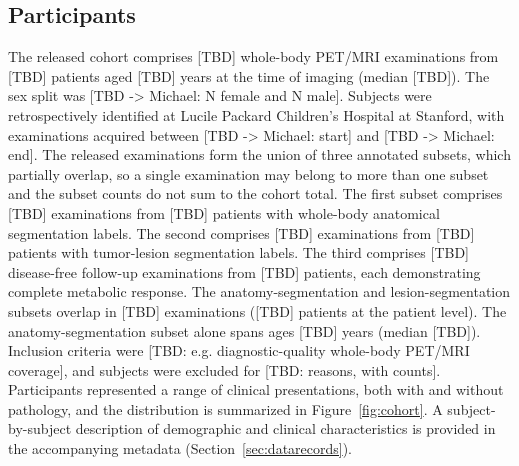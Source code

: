\subsection*{Participants}\label{subsec:cohort}
The released cohort comprises [TBD] whole-body PET/MRI examinations from [TBD] patients aged [TBD] years at the time of imaging (median [TBD]).
The sex split was [TBD -> Michael: N female and N male].
Subjects were retrospectively identified at Lucile Packard Children's Hospital at Stanford, with examinations acquired between [TBD -> Michael: start] and [TBD -> Michael: end].
The released examinations form the union of three annotated subsets, which partially overlap, so a single examination may belong to more than one subset and the subset counts do not sum to the cohort total.
The first subset comprises [TBD] examinations from [TBD] patients with whole-body anatomical segmentation labels.
The second comprises [TBD] examinations from [TBD] patients with tumor-lesion segmentation labels.
The third comprises [TBD] disease-free follow-up examinations from [TBD] patients, each demonstrating complete metabolic response.
The anatomy-segmentation and lesion-segmentation subsets overlap in [TBD] examinations ([TBD] patients at the patient level).
The anatomy-segmentation subset alone spans ages [TBD] years (median [TBD]).
Inclusion criteria were [TBD: e.g. diagnostic-quality whole-body PET/MRI coverage], and subjects were excluded for [TBD: reasons, with counts].
Participants represented a range of clinical presentations, both with and without pathology, and the distribution is summarized in Figure~\ref{fig:cohort}.
A subject-by-subject description of demographic and clinical characteristics is provided in the accompanying metadata (Section~\ref{sec:datarecords}).

